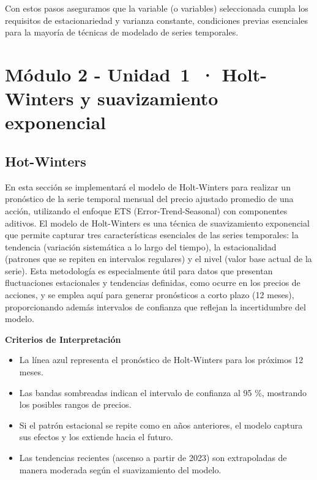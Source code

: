 \documentclass[
  11pt,
]{book}
\begin{document}
Con estos pasos aseguramos que la variable (o variables) seleccionada cumpla los requisitos de estacionariedad y varianza constante, condiciones previas esenciales para la mayoría de técnicas de modelado de series temporales.

\chapter{Módulo 2 - Unidad~1~· Holt-Winters y suavizamiento exponencial}\label{unidad4}

\section{Hot-Winters}\label{hot-winters}

En esta sección se implementará el modelo de Holt-Winters para realizar un pronóstico de la serie temporal mensual del precio ajustado promedio de una acción, utilizando el enfoque ETS (Error-Trend-Seasonal) con componentes aditivos. El modelo de Holt-Winters es una técnica de suavizamiento exponencial que permite capturar tres características esenciales de las series temporales: la tendencia (variación sistemática a lo largo del tiempo), la estacionalidad (patrones que se repiten en intervalos regulares) y el nivel (valor base actual de la serie). Esta metodología es especialmente útil para datos que presentan fluctuaciones estacionales y tendencias definidas, como ocurre en los precios de acciones, y se emplea aquí para generar pronósticos a corto plazo (12 meses), proporcionando además intervalos de confianza que reflejan la incertidumbre del modelo.

\textbf{Criterios de Interpretación}

\begin{itemize}
\item
  La línea azul representa el pronóstico de Holt-Winters para los próximos 12 meses.
\item
  Las bandas sombreadas indican el intervalo de confianza al 95 \%, mostrando los posibles rangos de precios.
\item
  Si el patrón estacional se repite como en años anteriores, el modelo captura sus efectos y los extiende hacia el futuro.
\item
  Las tendencias recientes (ascenso a partir de 2023) son extrapoladas de manera moderada según el suavizamiento del modelo.
\end{itemize}
\end{document}
